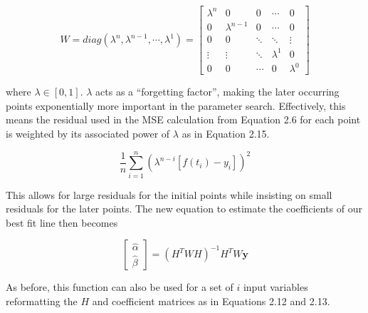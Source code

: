 \begin{equation}
    W = diag(\lambda^{n}, \lambda^{n-1}, \cdots, \lambda^{1}) = 
    \begin{bmatrix}
    \lambda^{n} & 0 & 0 & \cdots & 0 \\
    0 & \lambda^{n-1} & 0 & \cdots & 0 \\
    0 & 0 & \ddots & \ddots & \vdots \\
    \vdots & \vdots & \ddots & \lambda^{1} & 0 \\
    0 & 0 & \cdots & 0 & \lambda^{0}
    \end{bmatrix}
\end{equation}

where $\lambda\in{[0,1]}$. $\lambda$ acts as a ``forgetting factor'', making the later occurring points exponentially more important in the parameter search. Effectively, this means the residual used in the MSE calculation from Equation 2.6 for each point is weighted by its associated power of $\lambda$ as in Equation 2.15. 

\begin{equation}
    \frac{1}{n}\sum_{i=1}^{n} (\lambda^{n-i}[f(t_{i}) - y_{i}])^2
\end{equation}

This allows for large residuals for the initial points while insisting on small residuals for the later points. The new equation to estimate the coefficients of our best fit line then becomes

\begin{equation}
\begin{bmatrix}
\hat{\alpha} \\
\hat{\beta}
\end{bmatrix}
=
(H^{T}WH)^{-1}H^{T}W\bm{y}
\end{equation}

As before, this function can also be used for a set of $i$ input variables reformatting the $H$ and coefficient matrices as in Equations 2.12 and 2.13.